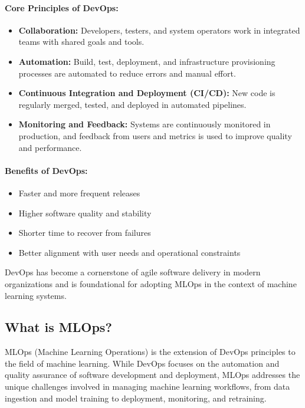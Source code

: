 \paragraph{Core Principles of DevOps:}
\begin{itemize}
	\item \textbf{Collaboration:} Developers, testers, and system operators work in integrated teams with shared goals and tools.
	\item \textbf{Automation:} Build, test, deployment, and infrastructure provisioning processes are automated to reduce errors and manual effort.
	\item \textbf{Continuous Integration and Deployment (CI/CD):} New code is regularly merged, tested, and deployed in automated pipelines.
	\item \textbf{Monitoring and Feedback:} Systems are continuously monitored in production, and feedback from users and metrics is used to improve quality and performance.
\end{itemize}

\paragraph{Benefits of DevOps:}
\begin{itemize}
	\item Faster and more frequent releases
	\item Higher software quality and stability
	\item Shorter time to recover from failures
	\item Better alignment with user needs and operational constraints
\end{itemize}

DevOps has become a cornerstone of agile software delivery in modern organizations and is foundational for adopting MLOps in the context of machine learning systems.

%
\subsection{What is MLOps?}

MLOps (Machine Learning Operations) is the extension of DevOps principles to the field of machine learning. While DevOps focuses on the automation and quality assurance of software development and deployment, MLOps addresses the unique challenges involved in managing machine learning workflows, from data ingestion and model training to deployment, monitoring, and retraining.

